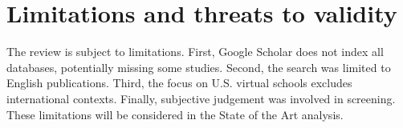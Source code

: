 \section{Limitations and threats to validity}
The review is subject to limitations. First, Google Scholar does not index all databases, potentially missing some studies. Second, the search was limited to English publications. Third, the focus on U.S. virtual schools excludes international contexts. Finally, subjective judgement was involved in screening. These limitations will be considered in the State of the Art analysis.